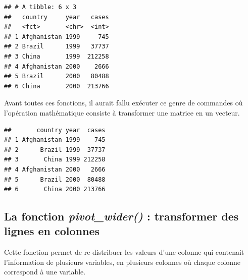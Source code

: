 \documentclass[
]{book}
\newenvironment{Shaded}{\begin{snugshade}}{\end{snugshade}}
\newcommand{\AttributeTok}[1]{\textcolor[rgb]{0.77,0.63,0.00}{#1}}
\newcommand{\DecValTok}[1]{\textcolor[rgb]{0.00,0.00,0.81}{#1}}
\newcommand{\FunctionTok}[1]{\textcolor[rgb]{0.00,0.00,0.00}{#1}}
\newcommand{\NormalTok}[1]{#1}
\newcommand{\SpecialCharTok}[1]{\textcolor[rgb]{0.00,0.00,0.00}{#1}}
\newcommand{\StringTok}[1]{\textcolor[rgb]{0.31,0.60,0.02}{#1}}
\theoremstyle{definition}
\theoremstyle{definition}
\theoremstyle{definition}
\theoremstyle{definition}
\theoremstyle{remark}
\begin{document}
\begin{verbatim}
## # A tibble: 6 x 3
##   country     year   cases
##   <fct>       <chr>  <int>
## 1 Afghanistan 1999     745
## 2 Brazil      1999   37737
## 3 China       1999  212258
## 4 Afghanistan 2000    2666
## 5 Brazil      2000   80488
## 6 China       2000  213766
\end{verbatim}

Avant toutes ces fonctions, il aurait fallu exécuter ce genre de commandes où l'opération mathématique consiste à transformer une matrice en un vecteur.

\begin{Shaded}
\end{Shaded}

\begin{verbatim}
##       country year  cases
## 1 Afghanistan 1999    745
## 2      Brazil 1999  37737
## 3       China 1999 212258
## 4 Afghanistan 2000   2666
## 5      Brazil 2000  80488
## 6       China 2000 213766
\end{verbatim}

\hypertarget{la-fonction-pivot_wider-transformer-des-lignes-en-colonnes}{%
\subsection{\texorpdfstring{La fonction \emph{pivot\_wider()} : transformer des lignes en colonnes}{La fonction pivot\_wider() : transformer des lignes en colonnes}}\label{la-fonction-pivot_wider-transformer-des-lignes-en-colonnes}}

Cette fonction permet de re-distribuer les valeurs d'une colonne qui contenait l'information de plusieurs variables, en plusieurs colonnes où chaque colonne correspond à une variable.
\end{document}
